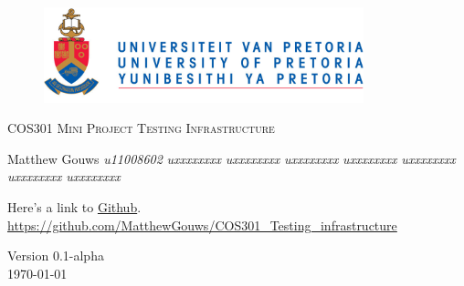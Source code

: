 \begin{titlepage}
	\begin{center}
		
		\begin{figure}[t]
			\centering
			\includegraphics[width=350px]{UP_Logo.png}
		\end{figure}
		
		\textsc{\LARGE COS301 Mini Project Testing \newline\newline Infrastructure}
		
		\begin{flushright} \large
			Matthew Gouws \emph{u11008602} \newline
			 \emph{uxxxxxxxx} \newline
			 \emph{uxxxxxxxx} \newline
			 \emph{uxxxxxxxx} \newline
			 \emph{uxxxxxxxx} \newline
			 \emph{uxxxxxxxx} \newline
			 \emph{uxxxxxxxx} \newline
			 \emph{uxxxxxxxx} \newline
		\end{flushright}
		
		\vfill
		
	Here's a link to \href{https://github.com/MatthewGouws/COS301_Testing_infrastructure}{Github}.\\
	\url{https://github.com/MatthewGouws/COS301_Testing_infrastructure}

	\vfill

	{\large Version 0.1-alpha}
	\\
	{\large \today}		
		
		
	\end{center}
\end{titlepage}
